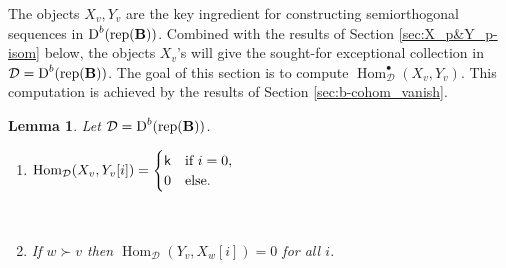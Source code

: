 \documentclass[sn-mathphys-num]{sn-jnl}%
\newcommand{\D}{\mathcal D}
\newcommand{\rep}{{\mathrm{rep}}}
\newcommand*{\Dd}{\mathop{\mathrm D\kern0pt}\nolimits}
\newcommand*{\Hom}{\mathop{\mathrm {Hom}}\nolimits}
\newcommand{\sk}{{\sf k}}
\newcommand{\fb}{\mathbf B}
\def\text#1{\mbox{#1}}
\newtheorem{lemma}[theorem]{Lemma}
\theoremstyle{definition}
\begin{document}
The objects $X_v,Y_v$ are the key ingredient for constructing semiorthogonal sequences in $\Dd^b (\rep(\fb))$. Combined with the results of Section \ref{sec:X_p&Y_p-isom} below, the objects $X_v$'s will give the sought-for exceptional collection in $\D=\Dd^b (\rep(\fb))$. The goal of this section is to compute $\Hom_\D^{\bullet}(X_v,Y_v)$. This computation is achieved by the results of Section \ref{sec:b-cohom_vanish}.

\begin{lemma}\label{lem:X_p-Y_p-isom}
    \label{lem:XYmix}Let $\D=\Dd^b (\rep ({\fb}))$.
    \begin{enumerate}
        \item $\Hom_\D( X_v,Y_v[i])=\begin{cases}\sk &\text{if $i=0$},\\
0&\text{else.}\end{cases}$

\

\item If $w\succ  v$ then $\Hom_\D(Y_v, X_w[i])=0$ for all $i$.
    \end{enumerate}
\end{lemma}
\end{document}
